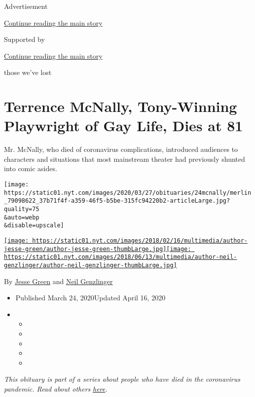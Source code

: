 Advertisement

\protect\hyperlink{after-top}{Continue reading the main story}

Supported by

\protect\hyperlink{after-sponsor}{Continue reading the main story}

those we've lost

\hypertarget{terrence-mcnally-tony-winning-playwright-of-gay-life-dies-at-81}{%
\section{Terrence McNally, Tony-Winning Playwright of Gay Life, Dies at
81}\label{terrence-mcnally-tony-winning-playwright-of-gay-life-dies-at-81}}

Mr. McNally, who died of coronavirus complications, introduced audiences
to characters and situations that most mainstream theater had previously
shunted into comic asides.

\texttt{[image: https://static01.nyt.com/images/2020/03/27/obituaries/24mcnally/merlin\_79098622\_37b71f4f-a359-46f5-b5be-315fc94220b2-articleLarge.jpg?quality=75\\\&auto=webp\\\&disable=upscale]}

\href{https://www.nytimes.com/by/jesse-green}{\texttt{[image: https://static01.nyt.com/images/2018/02/16/multimedia/author-jesse-green/author-jesse-green-thumbLarge.jpg]}}\href{https://www.nytimes.com/by/neil-genzlinger}{\texttt{[image: https://static01.nyt.com/images/2018/06/13/multimedia/author-neil-genzlinger/author-neil-genzlinger-thumbLarge.jpg]}}

By \href{https://www.nytimes.com/by/jesse-green}{Jesse Green} and
\href{https://www.nytimes.com/by/neil-genzlinger}{Neil Genzlinger}

\begin{itemize}
\item
  Published March 24, 2020Updated April 16, 2020
\item
  \begin{itemize}
  \item
  \item
  \item
  \item
  \item
  \end{itemize}
\end{itemize}

\emph{This obituary is part of a series about people who have died in
the coronavirus pandemic. Read about others}
\href{https://www.nytimes.com/series/people-who-have-died-of-the-coronavirus}{\emph{here}}\emph{.}

